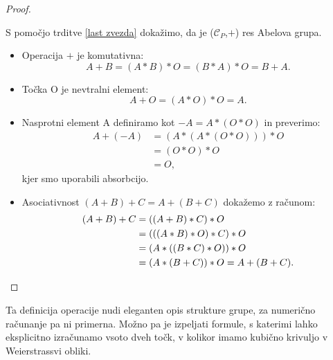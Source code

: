 \documentclass[12pt,a4paper,twoside]{article}
\theoremstyle{definition} %
\theoremstyle{plain} %
\numberwithin{equation}{section}  %
\begin{document}
\begin{proof}~

S pomočjo trditve \ref{last zvezda} dokažimo, da je ($\mathcal{C}_P$,$+$) res Abelova grupa.

\begin{itemize}
\item Operacija $+$ je komutativna:
$$A+B = (A \ast B ) \ast O = (B \ast A) \ast O = B+A.$$
\item Točka O je nevtralni element:
$$A+O=(A \ast O) \ast O = A.$$
\item Nasprotni element A definiramo kot $-A = A \ast (O \ast O )$ in preverimo:
\begin{align}
A + (-A) &{} = (A \ast (A \ast (O \ast O))) \ast O \nonumber \\
&{} = (O \ast O) \ast O \nonumber \\
&{} = O, \nonumber
\end{align}
kjer smo uporabili absorbcijo.
\item Asociativnost $(A + B) + C = A + (B + C)$ dokažemo z računom:
\begin{align}
(A + B) + C &{} = ((A + B) \ast C) \ast O \nonumber \\
&{} = (((A \ast B) \ast O) \ast C) \ast O \nonumber \\
&{} = (A \ast ((B \ast C) \ast O)) \ast O \nonumber \\
&{} = (A \ast (B + C)) \ast O = A + (B + C). \nonumber \qedhere
\end{align}
\end{itemize}
\end{proof}

Ta definicija operacije nudi eleganten opis strukture grupe, za numerično računanje pa ni primerna. Možno pa je izpeljati formule, s katerimi lahko eksplicitno
izračunamo vsoto dveh točk, v kolikor imamo kubično krivuljo v Weierstrassvi obliki.
\end{document}
